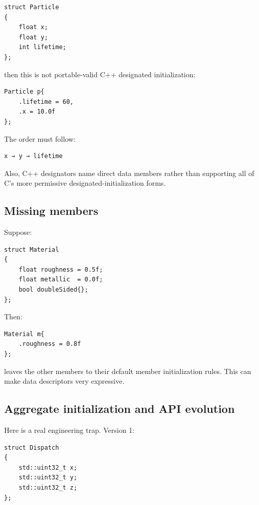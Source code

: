 \begin{verbatim}
struct Particle
{
    float x;
    float y;
    int lifetime;
};
\end{verbatim}

then this is not portable-valid C++ designated initialization:

\begin{verbatim}
Particle p{
    .lifetime = 60,
    .x = 10.0f
};
\end{verbatim}

The order must follow:

\begin{verbatim}
x → y → lifetime
\end{verbatim}

Also, C++ designators name direct data members rather than supporting all of C's more permissive designated-initialization forms.

\subsection{Missing members}\label{01-foundations-i-ch003-missing-members}

\hypertarget{01-foundations-i-ch003-missing-members}{}

Suppose:

\begin{verbatim}
struct Material
{
    float roughness = 0.5f;
    float metallic  = 0.0f;
    bool doubleSided{};
};
\end{verbatim}

Then:

\begin{verbatim}
Material m{
    .roughness = 0.8f
};
\end{verbatim}

leaves the other members to their default member initialization rules. This can make data descriptors very expressive.

\subsection{Aggregate initialization and API evolution}\label{01-foundations-i-ch003-aggregate-initialization-and-api-evolution}

\hypertarget{01-foundations-i-ch003-aggregate-initialization-and-api-evolution}{}

Here is a real engineering trap. Version 1:

\begin{verbatim}
struct Dispatch
{
    std::uint32_t x;
    std::uint32_t y;
    std::uint32_t z;
};
\end{verbatim}


